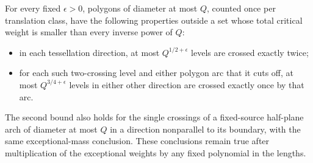\begin{lemma}\label{R:signed:cut-counts}
For every fixed $\epsilon>0$, polygons of diameter at most $Q$, counted
once per translation class, have the following properties outside a set
whose total critical weight is smaller than every inverse power of $Q$:
\begin{itemize}
\item in each tessellation direction, at most $Q^{1/2+\epsilon}$ levels
are crossed exactly twice;
\item for each such two-crossing level and either polygon arc that it
cuts off, at most $Q^{3/4+\epsilon}$ levels in either other direction
are crossed exactly once by that arc.
\end{itemize}
The second bound also holds for the single crossings of a fixed-source
half-plane arch of diameter at most $Q$ in a direction nonparallel to its
boundary, with the same exceptional-mass conclusion. These conclusions
remain true after multiplication of the exceptional weights by any fixed
polynomial in the lengths.
\end{lemma}
